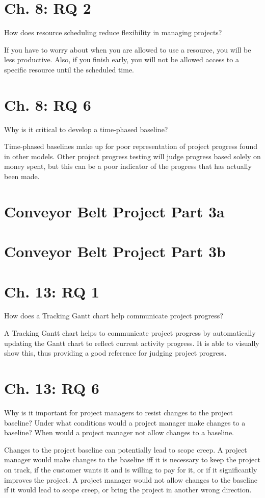 \documentclass[12pt, letter]{extarticle}
\begin{document}
\section{Ch. 8: RQ 2}
How does resource scheduling reduce flexibility in managing projects?

If you have to worry about when you are allowed to use a resource, you will be less productive.
Also, if you finish early, you will not be allowed access to a specific resource until the scheduled time.

\section{Ch. 8: RQ 6}
Why is it critical to develop a time-phased baseline?

Time-phased baselines make up for poor representation of project progress found in other models.
Other project progress testing will judge progress based solely on money spent, but this can be a poor indicator of the progress that has actually been made.

\section{Conveyor Belt Project Part 3a}
\section{Conveyor Belt Project Part 3b}

\section{Ch. 13: RQ 1}
How does a Tracking Gantt chart help communicate project progress?

A Tracking Gantt chart helps to communicate project progress by automatically updating the Gantt chart to reflect current activity progress.  It is able to visually show this, thus providing a good reference for judging project progress.

\section{Ch. 13: RQ 6}
Why is it important for project managers to resist changes to the project baseline?  Under what conditions would a project manager make changes to a baseline? When would a project manager not allow changes to a baseline.

Changes to the project baseline can potentially lead to scope creep.
A project manager would make changes to the baseline iff it is necessary to keep the project on track, if the customer wants it and is willing to pay for it, or if it significantly improves the project.
A project manager would not allow changes to the baseline if it would lead to scope creep, or bring the project in another wrong direction.
\end{document}

